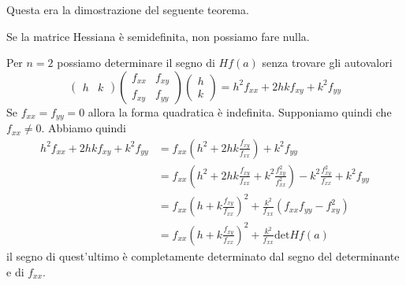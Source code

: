 \documentclass[a4paper]{article}
\begin{document}
Questa era la dimostrazione del seguente teorema.


Se la matrice Hessiana è semidefinita, non possiamo fare nulla.

Per \(n=2\) possiamo determinare il segno di \(Hf(a)\) senza trovare gli autovalori
\[
    \begin{pmatrix}
        h & k
    \end{pmatrix}
    \begin{pmatrix}
        f_{xx} & f_{xy} \\
        f_{xy} & f_{yy}
    \end{pmatrix}
    \begin{pmatrix}
        h \\ k
    \end{pmatrix}
    =
    h^2 f_{xx} + 2hkf_{xy} + k^2 f_{yy}
\]
Se \(f_{xx} = f_{yy} = 0\) allora la forma quadratica è indefinita.
Supponiamo quindi che \(f_{xx} \neq 0\).
Abbiamo quindi
\begin{align*}
    h^2 f_{xx} + 2hk f_{xy} + k^2 f_{yy}
    &= f_{xx} \left(h^2 + 2hk \frac{f_{xy}}{f_{xx}}\right)
    + k^2 f_{yy} \\
    &= f_{xx} \left(
        h^2 + 2hk \frac{f_{xy}}{f_{xx}} + k^2 \frac{f_{xy}^2}{f_{xx}^2}
    \right) - k^2 \frac{f_{xy}^2}{f_{xx}} + k^2 f_{yy} \\
    &= f_{xx} {\left(h + k \frac{f_{xy}}{f_{xx}}\right)}^2
    + \frac{k^2}{f_{xx}} \left(f_{xx}f_{yy} - f_{xy}^2\right) \\
    &= f_{xx} {\left(h + k \frac{f_{xy}}{f_{xx}}\right)}^2
    + \frac{k^2}{f_{xx}} \text{det} Hf(a)
\end{align*}
il segno di quest'ultimo è completamente determinato dal segno del determinante e di \(f_{xx}\).
\end{document}
